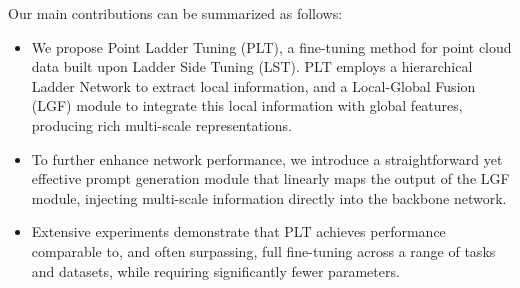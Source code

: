 

Our main contributions can be summarized as follows:

\begin{itemize}
\item We propose Point Ladder Tuning (PLT), a fine-tuning method for point cloud data built upon Ladder Side Tuning (LST). PLT employs a hierarchical Ladder Network to extract local information, and a Local-Global Fusion (LGF) module to integrate this local information with global features, producing rich multi-scale representations.
\item To further enhance network performance, we introduce a straightforward yet effective prompt generation module that linearly maps the output of the LGF module, injecting multi-scale information directly into the backbone network.
\item Extensive experiments demonstrate that PLT achieves performance comparable to, and often surpassing, full fine-tuning across a range of tasks and datasets, while requiring significantly fewer parameters.
\end{itemize}


